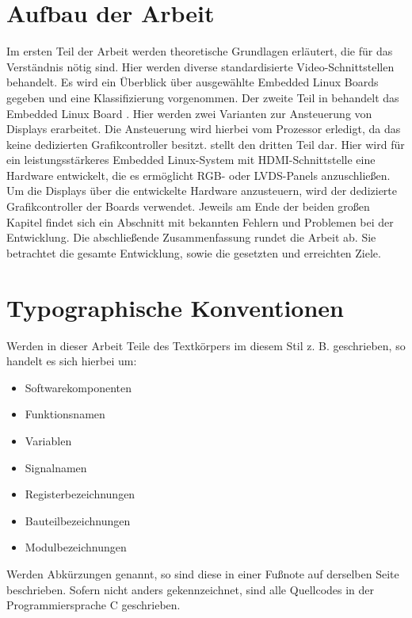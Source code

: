 \section{Aufbau der Arbeit}
Im ersten Teil der Arbeit werden theoretische Grundlagen erläutert, die für das Verständnis nötig sind. Hier werden diverse standardisierte Video-Schnittstellen behandelt. Es wird ein Überblick über ausgewählte Embedded Linux Boards gegeben und eine Klassifizierung vorgenommen.\newline
Der zweite Teil in  behandelt das Embedded Linux Board . Hier werden zwei Varianten zur Ansteuerung von Displays erarbeitet. Die Ansteuerung wird hierbei vom Prozessor erledigt, da das  keine dedizierten Grafikcontroller besitzt.\newline
{} stellt den dritten Teil dar. Hier wird für ein leistungsstärkeres Embedded Linux-System  mit HDMI-Schnittstelle eine Hardware entwickelt, die es ermöglicht RGB- oder LVDS-Panels anzuschließen. Um die Displays über die entwickelte Hardware anzusteuern, wird der dedizierte Grafikcontroller der Boards verwendet. Jeweils am Ende der beiden großen Kapitel findet sich ein Abschnitt mit bekannten Fehlern und Problemen bei der Entwicklung. \newline
Die abschließende Zusammenfassung rundet die Arbeit ab. Sie betrachtet die gesamte Entwicklung, sowie die gesetzten und erreichten Ziele.

\section{Typographische Konventionen}
Werden in dieser Arbeit Teile des Textkörpers im diesem Stil z. B.  geschrieben, so handelt es sich hierbei um:\begin{itemize}
\item Softwarekomponenten
\item Funktionsnamen
\item Variablen
\item Signalnamen
\item Registerbezeichnungen
\item Bauteilbezeichnungen
\item Modulbezeichnungen
\end{itemize}
Werden Abkürzungen genannt, so sind diese in einer Fußnote auf derselben Seite beschrieben.
Sofern nicht anders gekennzeichnet, sind alle Quellcodes in der Programmiersprache C geschrieben.
